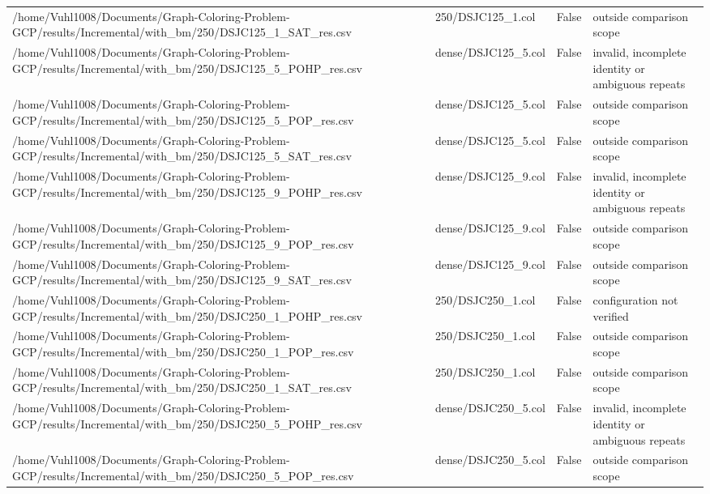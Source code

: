\begin{table}[htbp]
\begin{tabular}{llll}
/home/Vuhl1008/Documents/Graph-Coloring-Problem-GCP/results/Incremental/with\_bm/250/DSJC125\_1\_SAT\_res.csv & 250/DSJC125\_1.col & False & outside comparison scope \\
/home/Vuhl1008/Documents/Graph-Coloring-Problem-GCP/results/Incremental/with\_bm/250/DSJC125\_5\_POHP\_res.csv & dense/DSJC125\_5.col & False & invalid, incomplete identity or ambiguous repeats \\
/home/Vuhl1008/Documents/Graph-Coloring-Problem-GCP/results/Incremental/with\_bm/250/DSJC125\_5\_POP\_res.csv & dense/DSJC125\_5.col & False & outside comparison scope \\
/home/Vuhl1008/Documents/Graph-Coloring-Problem-GCP/results/Incremental/with\_bm/250/DSJC125\_5\_SAT\_res.csv & dense/DSJC125\_5.col & False & outside comparison scope \\
/home/Vuhl1008/Documents/Graph-Coloring-Problem-GCP/results/Incremental/with\_bm/250/DSJC125\_9\_POHP\_res.csv & dense/DSJC125\_9.col & False & invalid, incomplete identity or ambiguous repeats \\
/home/Vuhl1008/Documents/Graph-Coloring-Problem-GCP/results/Incremental/with\_bm/250/DSJC125\_9\_POP\_res.csv & dense/DSJC125\_9.col & False & outside comparison scope \\
/home/Vuhl1008/Documents/Graph-Coloring-Problem-GCP/results/Incremental/with\_bm/250/DSJC125\_9\_SAT\_res.csv & dense/DSJC125\_9.col & False & outside comparison scope \\
/home/Vuhl1008/Documents/Graph-Coloring-Problem-GCP/results/Incremental/with\_bm/250/DSJC250\_1\_POHP\_res.csv & 250/DSJC250\_1.col & False & configuration not verified \\
/home/Vuhl1008/Documents/Graph-Coloring-Problem-GCP/results/Incremental/with\_bm/250/DSJC250\_1\_POP\_res.csv & 250/DSJC250\_1.col & False & outside comparison scope \\
/home/Vuhl1008/Documents/Graph-Coloring-Problem-GCP/results/Incremental/with\_bm/250/DSJC250\_1\_SAT\_res.csv & 250/DSJC250\_1.col & False & outside comparison scope \\
/home/Vuhl1008/Documents/Graph-Coloring-Problem-GCP/results/Incremental/with\_bm/250/DSJC250\_5\_POHP\_res.csv & dense/DSJC250\_5.col & False & invalid, incomplete identity or ambiguous repeats \\
/home/Vuhl1008/Documents/Graph-Coloring-Problem-GCP/results/Incremental/with\_bm/250/DSJC250\_5\_POP\_res.csv & dense/DSJC250\_5.col & False & outside comparison scope \\

\end{tabular}
\end{table}
